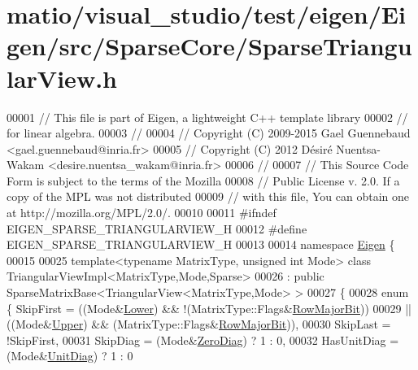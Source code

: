 \hypertarget{matio_2visual__studio_2test_2eigen_2_eigen_2src_2_sparse_core_2_sparse_triangular_view_8h_source}{}\section{matio/visual\+\_\+studio/test/eigen/\+Eigen/src/\+Sparse\+Core/\+Sparse\+Triangular\+View.h}
\label{matio_2visual__studio_2test_2eigen_2_eigen_2src_2_sparse_core_2_sparse_triangular_view_8h_source}

\begin{DoxyCode}
00001 \textcolor{comment}{// This file is part of Eigen, a lightweight C++ template library}
00002 \textcolor{comment}{// for linear algebra.}
00003 \textcolor{comment}{//}
00004 \textcolor{comment}{// Copyright (C) 2009-2015 Gael Guennebaud <gael.guennebaud@inria.fr>}
00005 \textcolor{comment}{// Copyright (C) 2012 Désiré Nuentsa-Wakam <desire.nuentsa\_wakam@inria.fr>}
00006 \textcolor{comment}{//}
00007 \textcolor{comment}{// This Source Code Form is subject to the terms of the Mozilla}
00008 \textcolor{comment}{// Public License v. 2.0. If a copy of the MPL was not distributed}
00009 \textcolor{comment}{// with this file, You can obtain one at http://mozilla.org/MPL/2.0/.}
00010 
00011 \textcolor{preprocessor}{#ifndef EIGEN\_SPARSE\_TRIANGULARVIEW\_H}
00012 \textcolor{preprocessor}{#define EIGEN\_SPARSE\_TRIANGULARVIEW\_H}
00013 
00014 \textcolor{keyword}{namespace }\hyperlink{namespace_eigen}{Eigen} \{
00015 
00025 \textcolor{keyword}{template}<\textcolor{keyword}{typename} MatrixType, \textcolor{keywordtype}{unsigned} \textcolor{keywordtype}{int} Mode> \textcolor{keyword}{class }TriangularViewImpl<MatrixType,Mode,Sparse>
00026   : \textcolor{keyword}{public} SparseMatrixBase<TriangularView<MatrixType,Mode> >
00027 \{
00028     \textcolor{keyword}{enum} \{ SkipFirst = ((Mode&\hyperlink{group__enums_gga39e3366ff5554d731e7dc8bb642f83cda891792b8ed394f7607ab16dd716f60e6}{Lower}) && !(MatrixType::Flags&\hyperlink{group__flags_gae4f56c2a60bbe4bd2e44c5b19cbe8762}{RowMajorBit}))
00029                     || ((Mode&\hyperlink{group__enums_gga39e3366ff5554d731e7dc8bb642f83cda6bcb58be3b8b8ec84859ce0c5ac0aaec}{Upper}) &&  (MatrixType::Flags&\hyperlink{group__flags_gae4f56c2a60bbe4bd2e44c5b19cbe8762}{RowMajorBit})),
00030            SkipLast = !SkipFirst,
00031            SkipDiag = (Mode&\hyperlink{group__enums_gga39e3366ff5554d731e7dc8bb642f83cda884ff7240392e85aa6e4b3c957e36483}{ZeroDiag}) ? 1 : 0,
00032            HasUnitDiag = (Mode&\hyperlink{group__enums_gga39e3366ff5554d731e7dc8bb642f83cdaddb72f888ac85d5a1c52333e54f9374b}{UnitDiag}) ? 1 : 0

\end{DoxyCode}
